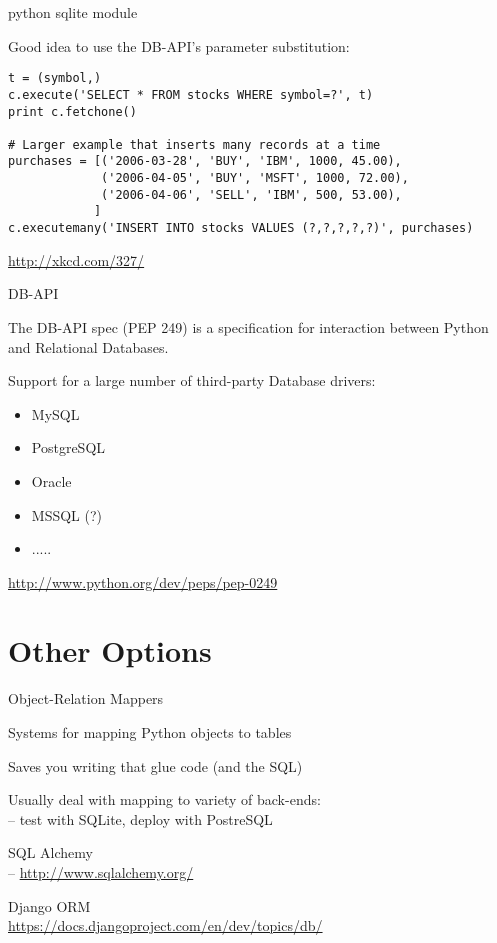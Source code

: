 \documentclass{beamer}
\begin{document}
\begin{frame}[fragile]{python sqlite module}

\vfill
{\large Good idea to use the DB-API’s parameter substitution:}

\begin{verbatim}
t = (symbol,)
c.execute('SELECT * FROM stocks WHERE symbol=?', t)
print c.fetchone()

# Larger example that inserts many records at a time
purchases = [('2006-03-28', 'BUY', 'IBM', 1000, 45.00),
             ('2006-04-05', 'BUY', 'MSFT', 1000, 72.00),
             ('2006-04-06', 'SELL', 'IBM', 500, 53.00),
            ]
c.executemany('INSERT INTO stocks VALUES (?,?,?,?,?)', purchases)
\end{verbatim}

\vfill
\url{http://xkcd.com/327/}
\end{frame} 

\begin{frame}[fragile]{DB-API}

\vfill
{\Large The DB-API spec (PEP 249) is a specification for interaction between Python and Relational Databases.}

\vfill
{\Large Support for a large number of third-party Database drivers:
\begin{itemize}
  \item MySQL
  \item PostgreSQL
  \item Oracle
  \item MSSQL (?)
  \item .....
\end{itemize}
}
\vfill
\url{http://www.python.org/dev/peps/pep-0249}
\end{frame} 


\section{Other Options}

\begin{frame}[fragile]{Object-Relation Mappers}

\vfill
{\Large Systems for mapping Python objects to tables}

\vfill
{\Large Saves you writing that glue code (and the SQL) }

\vfill
{\Large Usually deal with mapping to variety of back-ends:\\
 -- test with SQLite, deploy with PostreSQL}

\vfill
{\Large  SQL Alchemy}\\ 
 -- \url{http://www.sqlalchemy.org/}

\vfill
{\Large Django ORM}\\
\url{https://docs.djangoproject.com/en/dev/topics/db/}

\end{frame} 
\end{document}
